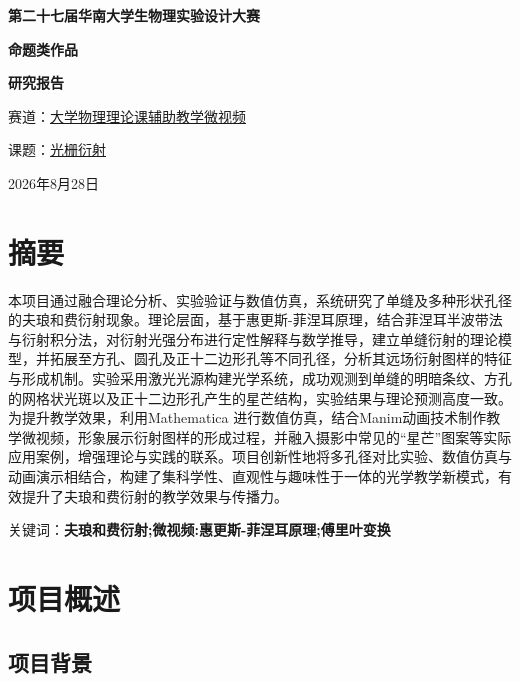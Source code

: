 \documentclass[12pt,a4paper]{ctexrep}
\begin{document}
\begin{titlepage}
\begin{center}
\vspace*{1.5cm}
{\heiti\bfseries 第二十七届华南大学生物理实验设计大赛\par}
\vspace{0.8cm}
{\heiti\bfseries 命题类作品\par}
\vspace{0.8cm}
{\fontsize{48pt}{58pt}\selectfont\bfseries 研究报告\par}
\vspace{1cm}
\vspace{2.5cm}
{ 赛道：\underline{大学物理理论课辅助教学微视频}\par}
\vspace{1.2cm}
{ 课题：\underline{光栅衍射}\par}
\vspace{1.2cm}
\vfill
{ 2026年8月28日\par}
\end{center}
\end{titlepage}

\section*{摘要}
本项目通过融合理论分析、实验验证与数值仿真，系统研究了单缝及多种形状孔径的夫琅和费衍射现象。理论层面，基于惠更斯-菲涅耳原理，结合菲涅耳半波带法与衍射积分法，对衍射光强分布进行定性解释与数学推导，建立单缝衍射的理论模型，并拓展至方孔、圆孔及正十二边形孔等不同孔径，分析其远场衍射图样的特征与形成机制。实验采用激光光源构建光学系统，成功观测到单缝的明暗条纹、方孔的网格状光斑以及正十二边形孔产生的星芒结构，实验结果与理论预测高度一致。为提升教学效果，利用Mathematica 进行数值仿真，结合Manim动画技术制作教学微视频，形象展示衍射图样的形成过程，并融入摄影中常见的“星芒”图案等实际应用案例，增强理论与实践的联系。项目创新性地将多孔径对比实验、数值仿真与动画演示相结合，构建了集科学性、直观性与趣味性于一体的光学教学新模式，有效提升了夫琅和费衍射的教学效果与传播力。

\noindent 关键词：\textbf{夫琅和费衍射;微视频:惠更斯-菲涅耳原理;傅里叶变换}

\tableofcontents

\section{项目概述}

\subsection{项目背景}
\end{document}
